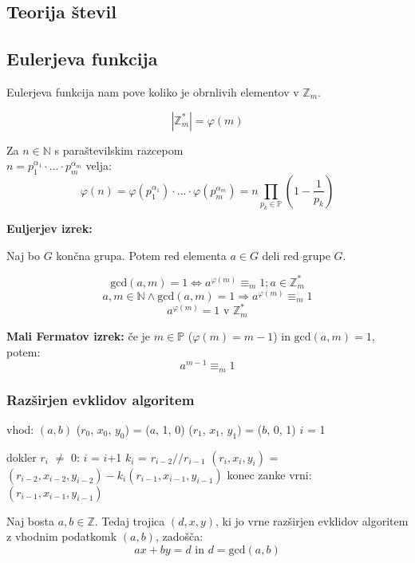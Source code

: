 \begin{multicols}{4}
\section*{Teorija števil}

\subsection{Eulerjeva funkcija}
Eulerjeva funkcija nam pove koliko je obrnlivih elementov v $\mathbb{Z}_m$.

\[ | \mathbb{Z}_m^* | = \varphi(m) \]

Za $n \in \mathbb{N}$ s paraštevilskim razcepom \\ $ n = p_1^{\alpha_1} \cdot ... \cdot p_m^{\alpha_m}$ velja:
\[\varphi(n) = \varphi(p_1^{\alpha_1}) \cdot ... \cdot \varphi(p_m^{\alpha_m}) = n \prod_{ p_k \in \mathbb{P}} \left(1-\frac{1}{p_k} \right) \]

\textbf{Euljerjev izrek:}

Naj bo $G$ končna grupa. Potem red elementa $a \in G$ deli red grupe $G$.

\[\textrm{gcd}(a, m) = 1 \Leftrightarrow a^{\varphi(m)} \equiv_m 1; a \in \mathbb{Z}_m^*\]
\[a,m \in \mathbb{N} \wedge \textrm{gcd}(a, m) = 1 \Rightarrow a^{\varphi(m)} \equiv_m 1\]
\[a^{\varphi(m)} = 1 \text{ v } \mathbb{Z}_m^*\]

\textbf{Mali Fermatov izrek:} če je $m \in \mathbb{P}$ ($\varphi(m) = m-1$) in $\textrm{gcd}(a,m) = 1$, potem:
\[a^{m-1} \equiv_m 1\]

\subsubsection*{Razširjen evklidov algoritem}

\begin{koda}
vhod: $(a, b)$
($r_0$, $x_0$, $y_0$) = ($a$, 1, 0)
($r_1$, $x_1$, $y_1$) = ($b$, 0, 1)
$i$ = 1

dokler $r_i$ $\neq$ 0:
    $i$ = $i$+1
    $k_i$ = $r_{i-2} // r_{i-1}$
    $(r_i, x_i, y_i)$ = $(r_{i-2}, x_{i-2}, y_{i-2}) - k_i(r_{i-1}, x_{i-1}, y_{i-1})$
konec zanke
vrni: $(r_{i-1}, x_{i-1}, y_{i-1})$
\end{koda}

Naj bosta $a, b \in \mathbb{Z}$. Tedaj trojica $(d, x, y)$, ki jo vrne razširjen evklidov algoritem z vhodnim podatkomk $(a, b)$, zadošča:
\[ax + by = d \text{ in } d = \textrm{gcd}(a, b)\] 



\end{multicols}
